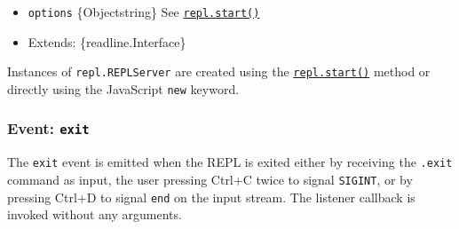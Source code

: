 \begin{itemize}
\tightlist
\item
  \texttt{options} \{Object\textbar string\} See
  \hyperref[replstartoptions]{\texttt{repl.start()}}
\item
  Extends: \{readline.Interface\}
\end{itemize}

Instances of \texttt{repl.REPLServer} are created using the
\hyperref[replstartoptions]{\texttt{repl.start()}} method or directly
using the JavaScript \texttt{new} keyword.

\begin{Shaded}
\begin{Highlighting}[]
\OperatorTok{=} \NormalTok{(}\NormalTok{)}\OperatorTok{;}

\OperatorTok{=}\NormalTok{ \{ }\OperatorTok{:} \NormalTok{ \}}\OperatorTok{;}

\OperatorTok{=}\OperatorTok{;}
\OperatorTok{=} \OperatorTok{;}
\end{Highlighting}
\end{Shaded}

\subsubsection{\texorpdfstring{Event:
\texttt{\textquotesingle{}exit\textquotesingle{}}}{Event: \textquotesingle exit\textquotesingle{}}}\label{event-exit}

The \texttt{\textquotesingle{}exit\textquotesingle{}} event is emitted
when the REPL is exited either by receiving the \texttt{.exit} command
as input, the user pressing Ctrl+C twice to signal \texttt{SIGINT}, or
by pressing Ctrl+D to signal
\texttt{\textquotesingle{}end\textquotesingle{}} on the input stream.
The listener callback is invoked without any arguments.

\begin{Shaded}
\begin{Highlighting}[]
\NormalTok{(}\OperatorTok{,}\NormalTok{ () }\KeywordTok{=\textgreater{}}\NormalTok{ \{}
  \NormalTok{(}\NormalTok{)}\OperatorTok{;}
  \NormalTok{()}\OperatorTok{;}
\NormalTok{\})}\OperatorTok{;}
\end{Highlighting}
\end{Shaded}

